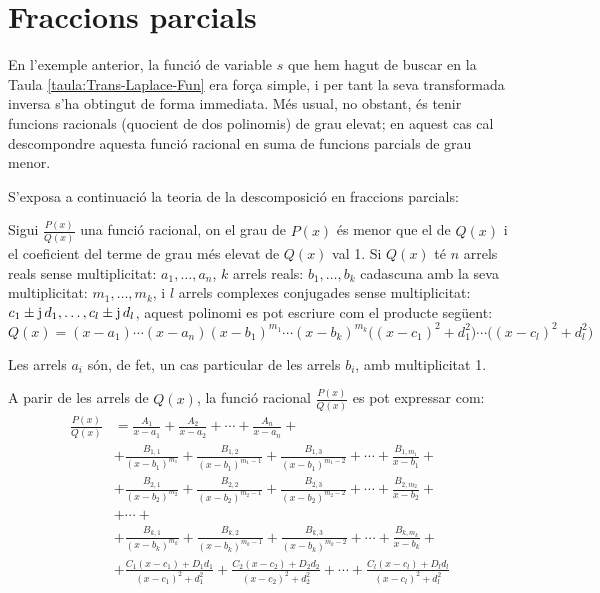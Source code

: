 \section{Fraccions parcials}

En l'exemple anterior, la funció de variable $s$ que hem hagut de
buscar en la Taula \vref{taula:Trans-Laplace-Fun} era força simple, i
per tant la seva transformada inversa s'ha obtingut de forma
immediata. Més usual, no obstant, és tenir funcions racionals
(quocient de dos polinomis) de grau elevat; en aquest cas cal
descompondre aquesta funció racional en suma de funcions parcials de
grau menor.

S'exposa a continuació la teoria de la descomposició en fraccions
parcials:

Sigui $\frac{P(x)}{Q(x)}$ una funció racional, on el grau de $P(x)$
és menor que el de $Q(x)$ i el coeficient del terme de grau més
elevat de $Q(x)$ val 1. Si $Q(x)$ té $n$ arrels reals sense
multiplicitat: $a_1,\ldots,a_n$, $k$ arrels reals: $b_1,\ldots,b_k$
cadascuna amb la seva multiplicitat: $m_1,\ldots,m_k$, i $l$ arrels
complexes conjugades sense multiplicitat: $c_1\pm
\mathrm{j}\,d_1,\ldots,c_l\pm \mathrm{j}\,d_l$, aquest polinomi es pot escriure
com el producte següent:
\begin{equation}
    Q(x)= (x-a_1) \cdots (x-a_n)(x-b_1)^{m_1} \cdots (x-b_k)^{m_k}
    \bigl((x-c_1)^2+d_1^2\bigr)\cdots\bigl((x-c_l)^2+d_l^2\bigr)
\end{equation}

Les arrels $a_i$ són, de fet, un cas particular de les arrels $b_i$,
amb multiplicitat 1.

A parir de les arrels de $Q(x)$, la funció  racional
$\frac{P(x)}{Q(x)}$ es pot expressar com:
\begin{equation}\begin{split}
    \frac{P(x)}{Q(x)} &= \frac{A_1}{x-a_1} + \frac{A_2}{x-a_2}
    + \cdots + \frac{A_n}{x-a_n} +{} \\[1.5ex]
   &+ \frac{B_{1,1}}{(x-b_1)^{m_1}} + \frac{B_{1,2}}{(x-b_1)^{m_1-1}}
   + \frac{B_{1,3}}{(x-b_1)^{m_1-2}} + \cdots +
   \frac{B_{1,m_1}}{x-b_1}+{} \\[1.5ex]
&+ \frac{B_{2,1}}{(x-b_2)^{m_2}} + \frac{B_{2,2}}{(x-b_2)^{m_2-1}}
   + \frac{B_{2,3}}{(x-b_2)^{m_2-2}} + \cdots  +
   \frac{B_{2,m_2}}{x-b_2} +{}\\[1.5ex]
   &+ \cdots +\\[1ex]
&+ \frac{B_{k,1}}{(x-b_k)^{m_k}} + \frac{B_{k,2}}{(x-b_k)^{m_k-1}}
   + \frac{B_{k,3}}{(x-b_k)^{m_k-2}} + \cdots +
   \frac{B_{k,m_k}}{x-b_k}+{}\\[1.5ex]
&+ \frac{C_1(x-c_1)+D_1 d_1}{(x-c_1)^2+d_1^2}+ \frac{C_2(x-c_2)+D_2
d_2}{(x-c_2)^2+d_2^2} +  \cdots +\frac{C_l(x-c_l)+D_l d_l}{(x-c_l)^2+d_l^2}\\[1.5ex]
\end{split}\end{equation}

